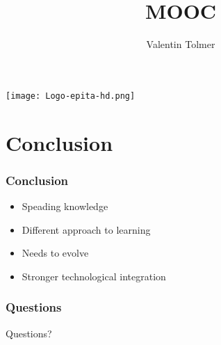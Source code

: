 \documentclass{beamer}
\title{MOOC}
\author{Valentin Tolmer}
\date{}
\institute{GCONFS -- EPITA 2013}
\newlength{\wideitemsep}
\let\olditem\item
\renewcommand{\item}{\setlength{\itemsep}{\wideitemsep}\olditem}
\begin{document}
\begin{frame}
  \titlepage
    \texttt{[image: Logo-epita-hd.png]}
\end{frame}

\begin{frame}
  \tableofcontents[pausesections ]
\end{frame}









\section{Conclusion}
\setcounter{subsection}{1}
\begin{frame}
\frametitle{Conclusion}
  \begin{itemize}[<+->]
    \item Speading knowledge
    \item Different approach to learning
    \item Needs to evolve
    \item Stronger technological integration
  \end{itemize}
\end{frame}

\begin{frame}
\frametitle{Questions}
  Questions?
\end{frame}
\end{document}
